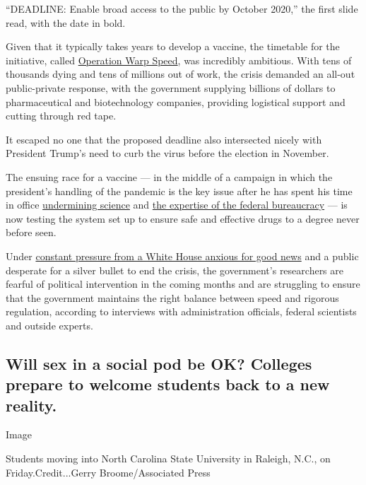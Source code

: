 ``DEADLINE: Enable broad access to the public by October 2020,'' the
first slide read, with the date in bold.

Given that it typically takes years to develop a vaccine, the timetable
for the initiative, called
\href{https://www.nytimes.com/2020/04/29/us/politics/trump-coronavirus-vaccine-operation-warp-speed.html}{Operation
Warp Speed}, was incredibly ambitious. With tens of thousands dying and
tens of millions out of work, the crisis demanded an all-out
public-private response, with the government supplying billions of
dollars to pharmaceutical and biotechnology companies, providing
logistical support and cutting through red tape.

It escaped no one that the proposed deadline also intersected nicely
with President Trump's need to curb the virus before the election in
November.

The ensuing race for a vaccine --- in the middle of a campaign in which
the president's handling of the pandemic is the key issue after he has
spent his time in office
\href{https://www.nytimes.com/2020/04/28/climate/trump-coronavirus-climate-science.html}{undermining
science} and
\href{https://www.nytimes.com/2020/07/09/climate/trump-hurricane-dorian-noaa.html}{the
expertise of the federal bureaucracy} --- is now testing the system set
up to ensure safe and effective drugs to a degree never before seen.

Under
\href{https://www.nytimes.com/2020/08/02/us/politics/coronavirus-vaccine.html}{constant
pressure from a White House anxious for good news} and a public
desperate for a silver bullet to end the crisis, the government's
researchers are fearful of political intervention in the coming months
and are struggling to ensure that the government maintains the right
balance between speed and rigorous regulation, according to interviews
with administration officials, federal scientists and outside experts.

\hypertarget{will-sex-in-a-social-pod-be-ok-colleges-prepare-to-welcome-students-back-to-a-new-reality}{%
\subsection{Will sex in a social pod be OK? Colleges prepare to welcome
students back to a new
reality.}\label{will-sex-in-a-social-pod-be-ok-colleges-prepare-to-welcome-students-back-to-a-new-reality}}

Image

Students moving into North Carolina State University in Raleigh, N.C.,
on Friday.Credit...Gerry Broome/Associated Press

